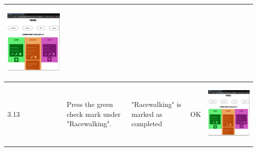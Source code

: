 \documentclass[12pt,twoside,titlepage,a4paper]{article}
\theoremstyle{definicion}
\theoremstyle{lema}
\theoremstyle{teorema}
\theoremstyle{corolario}
\theoremstyle{ejemplo}
\theoremstyle{nota}
\begin{document}
\begin{table}[!h]
\begin{tabular}{|m{0.6cm}|m{2.9cm}|m{3.6cm}|m{1.1cm}|m{5.9cm}|}
		\begin{center}\includegraphics[scale=0.22]{userpage8.png}\end{center} \\
		\hline
		3.13 & Press the green check mark under "Racewalking". & "Racewalking" is marked as completed & OK &
		\begin{center}\includegraphics[scale=0.22]{userpage9.png}\end{center} \\

\end{tabular}
\end{table}
\end{document}
